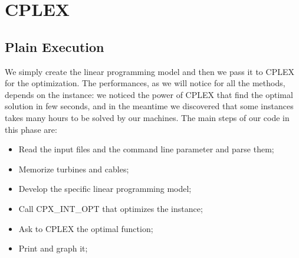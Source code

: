 
\chapter{CPLEX}

\label{chp:3-CPLEX}

\section{Plain Execution}
We simply create the linear programming model and then we pass it to CPLEX for the optimization. The performances, as we will notice for all the methods, depends on the instance: we noticed the power of CPLEX that find the optimal solution in few seconds, and in the meantime we discovered that some instances takes many hours to be solved by our machines. 
The main steps of our code in this phase are: 
\begin{itemize}
\item Read the input files and the command line parameter and parse them;
\item Memorize turbines and cables;
\item Develop the specific linear programming model;
\item Call CPX\_INT\_OPT that optimizes the instance;
\item Ask to CPLEX the optimal function;
\item Print and graph it;
\end{itemize}

